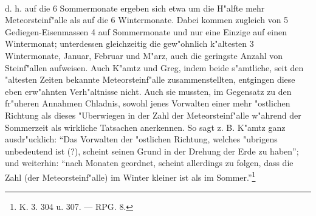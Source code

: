 \documentclass[a4paper, 8pt, oneside, polutonikogreek, german]{article}
\begin{document}
\paragraph{}
d. h. auf die 6 Sommermonate ergeben sich etwa um die H"alfte mehr Meteorsteinf"alle als auf die 6 Wintermonate. Dabei kommen zugleich von 5 Gediegen-Eisenmassen 4 auf Sommermonate und nur eine Einzige auf einen Wintermonat; unterdessen gleichzeitig die gew"ohnlich k"altesten 3 Wintermonate, Januar, Februar und M"arz, auch die geringste Anzahl von Steinf"allen aufweisen. Auch K"amtz und Greg, indem beide s"amtliche, seit den "altesten Zeiten bekannte Meteorsteinf"alle zusammenstellten, entgingen diese eben erw"ahnten Verh"altnisse nicht. Auch sie mussten, im Gegensatz zu den fr"uheren Annahmen Chladnis, sowohl jenes Vorwalten einer mehr "ostlichen Richtung als dieses "Uberwiegen in der Zahl der Meteorsteinf"alle w"ahrend der Sommerzeit als wirkliche Tatsachen anerkennen. So sagt z. B. K"amtz ganz ausdr"ucklich: "`Das Vorwalten der "ostlichen Richtung, welches "ubrigens unbedeutend ist (?), scheint seinen Grund in der Drehung der Erde zu haben"'; und weiterhin: "`nach Monaten geordnet, scheint allerdings zu folgen, dass die Zahl (der Meteorsteinf"alle) im Winter kleiner ist als im Sommer."'\footnote{K. 3. 304 u. 307. --- RPG. 8.}
\end{document}
